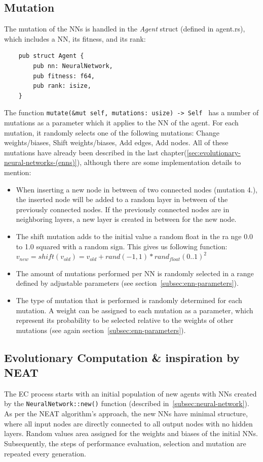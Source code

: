 \documentclass[11pt]{report}
\begin{document}
\begin{enumerate}
    \subsection{Mutation}\label{subsec:mutation}
    The mutation of the NNs is handled in the \textit{Agent} struct (defined in agent.rs), which includes a NN, its fitness, and its rank:
    \begin{verbatim}
    pub struct Agent {
        pub nn: NeuralNetwork,
        pub fitness: f64,
        pub rank: isize,
    }
    \end{verbatim}
    The function \texttt{mutate(&mut self, mutations: usize) -> Self {} } has a number of mutations as a parameter which it applies to the NN of the agent.
    For each mutation, it randomly selects one of the following mutations: Change weights/biases, Shift weights/biases, Add edges, Add nodes.
    All of these mutations have already been described in the last chapter(\ref{sec:evolutionary-neural-networks-(enns)}), although there are some implementation details to mention:
    \begin{itemize}
        \item When inserting a new node in between of two connected nodes (mutation 4.), the inserted node will be added to a random layer in between of the previously connected nodes.
        If the previously connected nodes are in neighboring layers, a new layer is created in between for the new node.
        \item The shift mutation adds to the initial value a random float in the ra nge 0.0 to 1.0 squared with a random sign.
        This gives us following function: \\
        $v_{new} = shift(v_{old}) = v_{old} + rand(-1, 1) * rand_{float}(0..1)^2$
        \item The amount of mutations performed per NN is randomly selected in a range defined by adjustable parameters (see section~\ref{subsec:enn-parameters}).
        \item The type of mutation that is performed is randomly determined for each mutation.
        A weight can be assigned to each mutation as a parameter, which represent its probability to be selected relative to the weights of other mutations (see again section~\ref{subsec:enn-parameters}).
    \end{itemize}

    \subsection{Evolutionary Computation \& inspiration by NEAT}\label{subsec:evolutionary-computation-&-inspiration-by-neat}
    The EC process starts with an initial population of new agents with NNs created by the \texttt{NeuralNetwork::new()} function (described in~\ref{subsec:neural-network}).
    As per the NEAT algorithm's approach, the new NNs have minimal structure, where all input nodes are directly connected to all output nodes with no hidden layers.
    Random values area assigned for the weights and biases of the initial NNs.
    Subsequently, the steps of performance evaluation, selection and mutation are repeated every generation.


\end{enumerate}
\end{document}
